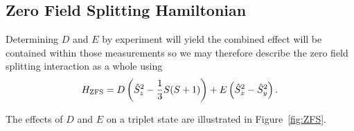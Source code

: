 \subsection{Zero Field Splitting Hamiltonian}
Determining $D$ and $E$ by experiment will yield the combined effect will be contained within those measurements so we may therefore describe the zero field splitting interaction as a whole using 
\begin{equation}
    H_{\ce{ZFS}} =D \left(\hat{S}_z^2 - \frac{1}{3}S(S+1)\right) + E\left(\hat{S}_x^2 - \hat{S}_y^2\right).
    \label{eq:ZFS_hamiltonian}
\end{equation}

The effects of $D$ and $E$ on a triplet state are illustrated in Figure~\ref{fig:ZFS}.



